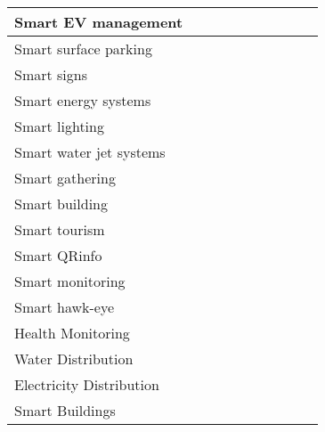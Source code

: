 \begin{table}[h!]
\begin{tabulary}{\textwidth}{L|C|C|C|C|C|C|C|C|C}
	Smart EV management        &            &          &               &             &     &      &                 &        & \\\hline
	Smart surface parking      &            &          &               &             &     &      &                 &        & \\\hline
	Smart signs                &            &          &               &             &     &      &                 &        & \\\hline
	Smart energy systems       &            &          &               &             &     &      &                 &        & \\\hline
	Smart lighting             &            &          &               &             &     &      &                 &        & \\\hline
	Smart water jet systems    &            &          &               &             &     &      &                 &        & \\\hline
	Smart gathering            &            &          &               &             &     &      &                 &        & \\\hline
	Smart building             &            &          &               &             &     &      &                 &        & \\\hline
	Smart tourism              &            &          &               &             &     &      &                 &        & \\\hline
	Smart QRinfo               &            &          &               &             &     &      &                 &        & \\\hline
	Smart monitoring           &            &          &               &             &     &      &                 &        & \\\hline
	Smart hawk-eye             &            &          &               &             &     &      &                 &        & \\\hline
	Health Monitoring          &            &          &               &             &     &      &                 &        & \\\hline
	Water Distribution         &            &          &               &             &     &      &                 &        & \\\hline
	Electricity Distribution   &            &          &               &             &     &      &                 &        & \\\hline
	Smart Buildings            &            &          &               &             &     &      &                 &        & \\\hline

\end{tabulary}
\end{table}
